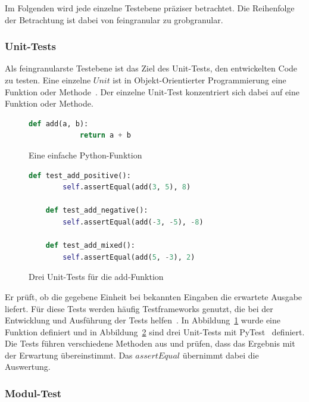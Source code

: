 Im Folgenden wird jede einzelne Testebene präziser betrachtet.
Die Reihenfolge der Betrachtung ist dabei von feingranular zu grobgranular.

\subsubsection{Unit-Tests}

Als feingranularste Testebene ist das Ziel des Unit-Tests, den entwickelten Code zu testen.
Eine einzelne $Unit$ ist in Objekt-Orientierter Programmierung eine Funktion oder Methode~\cite[vgl. Unit Testing]{software-testing-craftmans}.
Der einzelne Unit-Test konzentriert sich dabei auf eine Funktion oder Methode.

\begin{figure}[h!]
    \begin{lstlisting}[language=Python]
        def add(a, b):
            return a + b
    \end{lstlisting}
    \caption{Eine einfache Python-Funktion}
    \label{unitfkt}
\end{figure}

\begin{figure}[h!]
    \begin{lstlisting}[language=Python]
    def test_add_positive():
        self.assertEqual(add(3, 5), 8)

    def test_add_negative():
        self.assertEqual(add(-3, -5), -8)

    def test_add_mixed():
        self.assertEqual(add(5, -3), 2)
    \end{lstlisting}
    \caption{Drei Unit-Tests für die add-Funktion}
    \label{unitfkttest}
\end{figure}

Er prüft, ob die gegebene Einheit bei bekannten Eingaben die erwartete Ausgabe liefert.
Für diese Tests werden häufig Testframeworks genutzt, die bei der Entwicklung und Ausführung der Tests helfen~\cite{software-testing}.
In Abbildung~\ref{unitfkt} wurde eine Funktion definiert und in Abbildung~\ref{unitfkttest} sind drei Unit-Tests mit PyTest~\cite{pytest} definiert.
Die Tests führen verschiedene Methoden aus und prüfen, dass das Ergebnis mit der Erwartung übereinstimmt.
Das $assertEqual$ übernimmt dabei die Auswertung.

\subsubsection{Modul-Test}


